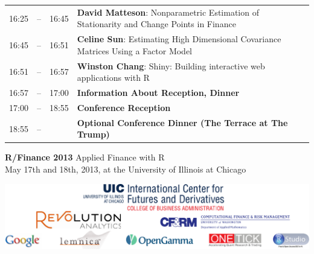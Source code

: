\begin{tabular}{rlrp{6.1in}}
16:25&\color{Breaks}--\hspace{-10ex}& 16:45&\textbf{\color{Talk} David Matteson}: \small{Nonparametric Estimation of Stationarity and Change Points in Finance} \\
16:45&\color{Breaks}--\hspace{-10ex}& 16:51&\textbf{\color{LightningTalk} Celine Sun}: \small{Estimating High Dimensional Covariance Matrices Using a Factor Model} \\
16:51&\color{Breaks}--\hspace{-10ex}& 16:57&\textbf{\color{LightningTalk} Winston Chang}: \small{Shiny: Building interactive web applications with R} \\
16:57&\color{Breaks}--\hspace{-10ex}& 17:00&\textbf{\color{Breaks} Information About Reception, Dinner} \\
17:00&\color{Breaks}--\hspace{-10ex}& 18:55&\textbf{\color{Breaks} Conference Reception} \\
18:55&\color{Breaks}--\hspace{-10ex}& &\textbf{\color{Breaks} Optional Conference Dinner (The Terrace at The Trump)} \\[12pt]
\end{tabular}

\clearpage

{\Huge \textbf{\color{KeynoteTalk} R/Finance 2013} \huge \phantom{i} Applied Finance with R} \\
{\large \color{Breaks} May 17th and 18th, 2013, at the University of Illinois at Chicago} \\
\vspace{3ex}
\hrulefill
\vspace{-2ex}
\begin{center}
\includegraphics[scale=0.8]{sponsors.pdf}
\end{center}
\vspace{-3ex}
\hrulefill

